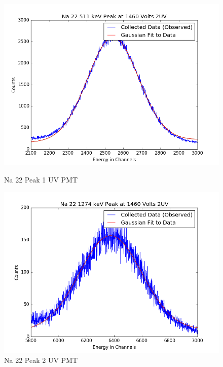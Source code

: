 \documentclass{article}
\begin{document}
\begin{figure}[H]
  \centering
  \begin{minipage}[b]{0.4\textwidth}
    \includegraphics[width=\textwidth]{2UVNa1fit.png}
    \caption{Na 22 Peak 1 UV PMT}
  \end{minipage}
  \hfill
  \begin{minipage}[b]{0.4\textwidth}
    \includegraphics[width=\textwidth]{2UVNa2fit.png}
    \caption{Na 22 Peak 2 UV PMT}
  \end{minipage}
\end{figure}
\end{document}
